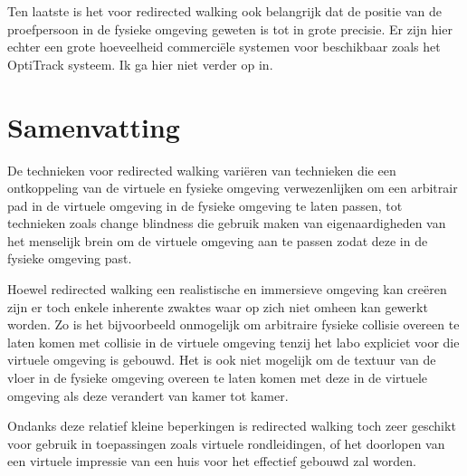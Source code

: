 Ten laatste is het voor redirected walking ook belangrijk dat de positie van
de proefpersoon in de fysieke omgeving geweten is tot in grote precisie. Er zijn
hier echter een grote hoeveelheid commerci\"ele systemen voor beschikbaar zoals
het OptiTrack systeem. Ik ga hier niet verder op in.


\section{Samenvatting}
De technieken voor redirected walking vari\"eren van technieken die een
ontkoppeling van de virtuele en fysieke omgeving verwezenlijken om een arbitrair
pad in de virtuele omgeving in de fysieke omgeving te laten passen, tot
technieken zoals change blindness die gebruik maken van eigenaardigheden van het
menselijk brein om de virtuele omgeving aan te passen zodat deze in de fysieke
omgeving past.

Hoewel redirected walking een realistische en immersieve omgeving kan cre\"eren 
zijn er toch enkele inherente zwaktes waar op zich niet omheen kan gewerkt 
worden. Zo is het bijvoorbeeld onmogelijk om arbitraire fysieke collisie overeen 
te laten komen met collisie in de virtuele omgeving tenzij het labo expliciet 
voor die virtuele omgeving is gebouwd. Het is ook niet mogelijk om de textuur van
de vloer in de fysieke omgeving overeen te laten komen met deze in de virtuele
omgeving als deze verandert van kamer tot kamer.

Ondanks deze relatief kleine beperkingen is redirected walking toch zeer
geschikt voor gebruik in toepassingen zoals virtuele rondleidingen, of het
doorlopen van een virtuele impressie van een huis voor het effectief gebouwd
zal worden.